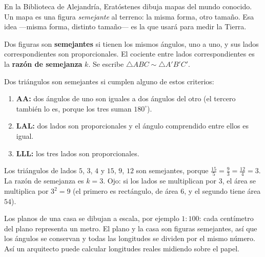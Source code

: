 \documentclass[11pt]{article}
\begin{document}
\label{tema:semejanza}

\begin{hilo}
En la Biblioteca de Alejandría, Eratóstenes dibuja mapas del mundo conocido. Un
mapa es una figura \emph{semejante} al terreno: la misma forma, otro tamaño. Esa
idea ---misma forma, distinto tamaño--- es la que usará para medir la Tierra.
\end{hilo}

\begin{definicion}
Dos figuras son \textbf{semejantes} si tienen los mismos ángulos, uno a uno, y sus
lados correspondientes son proporcionales. El cociente entre lados
correspondientes es la \textbf{razón de semejanza} $k$. Se escribe
$\triangle ABC \sim \triangle A'B'C'$.
\end{definicion}

\begin{teorema}
Dos triángulos son semejantes si cumplen alguno de estos criterios:
\begin{enumerate}[label=\textbf{\arabic*.}]
  \item \textbf{AA:} dos ángulos de uno son iguales a dos ángulos del otro (el
        tercero también lo es, porque los tres suman $180^\circ$).
  \item \textbf{LAL:} dos lados son proporcionales y el ángulo comprendido entre
        ellos es igual.
  \item \textbf{LLL:} los tres lados son proporcionales.
\end{enumerate}
\end{teorema}

\begin{ejemplo}
Los triángulos de lados $5$, $3$, $4$ y $15$, $9$, $12$ son semejantes, porque
$\frac{15}{5} = \frac{9}{3} = \frac{12}{4} = 3$. La razón de semejanza es $k = 3$.
Ojo: si los lados se multiplican por $3$, el área se multiplica por $3^2 = 9$
(el primero es rectángulo, de área $6$, y el segundo tiene área $54$).
\end{ejemplo}

\begin{aplicacion}
Los planos de una casa se dibujan a escala, por ejemplo $1:100$: cada centímetro
del plano representa un metro. El plano y la casa son figuras semejantes, así que
los ángulos se conservan y todas las longitudes se dividen por el mismo número. Así
un arquitecto puede calcular longitudes reales midiendo sobre el papel.
\end{aplicacion}
\end{document}
